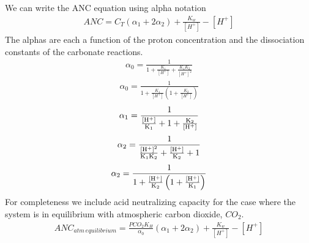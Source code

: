 \documentclass[letterpaper,10pt,english]{sphinxmanual}
\begin{document}
We can write the ANC equation using alpha notation
\begin{equation}\label{equation:Rapid_Mix/RM_Examples:Rapid_Mix/RM_Examples:10}
\begin{split}ANC = {C_T}({\alpha_1} + 2{\alpha_2}) + \frac{{{K_w}}}{{\left[ {{H^ + }} \right]}} - \left[ {{H^ + }} \right]\end{split}
\end{equation}
The alphas are each a function of the proton concentration and the dissociation constants of the carbonate reactions.
\begin{equation}\label{equation:Rapid_Mix/RM_Examples:Rapid_Mix/RM_Examples:11}
\begin{split}{\alpha_{\text{0}}} = \frac{1}{{1 + \frac{{{K_1}}}{{[{H^ + }]}} + \frac{{{K_1}{K_2}}}{{{{[{H^ + }]}^2}}}}}\end{split}
\end{equation}\begin{equation}\label{equation:Rapid_Mix/RM_Examples:Rapid_Mix/RM_Examples:12}
\begin{split}{\alpha_{\text{0}}} = \frac{1}{{1 + \frac{{{K_1}}}{{[{H^ + }]}}\left( {1 + \frac{{{K_2}}}{{[{H^ + }]}}} \right)}}\end{split}
\end{equation}\begin{equation}\label{equation:Rapid_Mix/RM_Examples:Rapid_Mix/RM_Examples:13}
\begin{split}{\alpha_{\text{1}}} = \frac{1}{{\frac{{[{{\rm H}^ + }]}}{{{{\rm K}_1}}} + 1 + \frac{{{{\rm K}_2}}}{{[{{\rm H}^ + }]}}}}\end{split}
\end{equation}\begin{equation}\label{equation:Rapid_Mix/RM_Examples:Rapid_Mix/RM_Examples:14}
\begin{split}{\alpha_{\text{2}}} = \frac{1}{{\frac{{{{[{{\rm H}^ + }]}^2}}}{{{{\rm K}_1}{{\rm K}_2}}} + \frac{{[{{\rm H}^ + }]}}{{{{\rm K}_2}}} + 1}}\end{split}
\end{equation}\begin{equation}\label{equation:Rapid_Mix/RM_Examples:Rapid_Mix/RM_Examples:15}
\begin{split}{\alpha_{\text{2}}} = \frac{1}{{1 + \frac{{[{{\rm H}^ + }]}}{{{{\rm K}_2}}}\left( {1 + \frac{{[{{\rm H}^ + }]}}{{{{\rm K}_1}}}} \right)}}\end{split}
\end{equation}
For completeness we include acid neutralizing capacity for the case where the system is in equilibrium with atmospheric carbon dioxide,
\(CO_2\).
\begin{equation}\label{equation:Rapid_Mix/RM_Examples:Rapid_Mix/RM_Examples:16}
\begin{split}ANC_{atm\,equilibrium} = \frac{{{P{C{O_2}}}{K_H}}}{{{\alpha_0}}}({\alpha_1} + 2{\alpha_2}) + \frac{{{K_w}}}{{\left[ {{H^ + }} \right]}} - \left[ {{H^ + }} \right]\end{split}
\end{equation}
\end{document}
